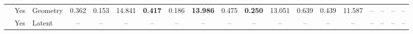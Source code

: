 \begin{table}[t]
{\begin{tabular}{@{}lcl*{16}{c}@{}}
      & Yes & Geometry
      & 0.362 & 0.153 & 14.841
      & \textbf{0.417} & 0.186 & \textbf{13.986}
      & 0.475 & \textbf{0.250} & 13.051
      & 0.639 & 0.439 & 11.587
      & -- & -- & -- & -- \\

      & Yes & Latent
      & -- & -- & --
      & -- & -- & --
      & -- & -- & --
      & -- & -- & --
      & -- & -- & -- & -- \\
      \bottomrule
    \end{tabular}%
  }
\end{table}
